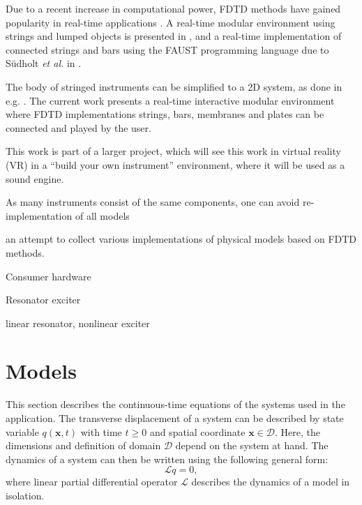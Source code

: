 \documentclass{article}
\begin{document}
Due to a recent increase in computational power, FDTD methods have gained popularity in real-time applications \cite{WillemsenThesis}. A real-time modular environment using strings and lumped objects is presented in \cite{Bilbao2019}, and a real-time implementation of connected strings and bars using the FAUST programming language due to S\"udholt \textit{et al.} in \cite{Sudholt2021}. 

The body of stringed instruments can be simplified to a 2D system, as done in e.g. \cite{Willemsen2019, Willemsen2020}. The current work presents a real-time interactive modular environment where FDTD implementations strings, bars, membranes and plates can be connected and played by the user. 

This work is part of a larger project, which will see this work in virtual reality (VR) in a ``build your own instrument'' environment, where it will be used as a sound engine.

As many instruments consist of the same components, one can avoid re-implementation of all models 

an attempt to collect various implementations of physical models based on FDTD methods. 


Consumer hardware 


Resonator exciter \cite{Borin1989}

linear resonator, nonlinear exciter




\section{Models}\label{sec:models}
This section describes the continuous-time equations of the systems used in the application. The transverse displacement of a system can be described by state variable $q(\boldsymbol{x}, t)$ with time $t\geq 0$ and spatial coordinate $\boldsymbol{x}\in \mathcal{D}$. Here, the dimensions and definition of domain $\mathcal{D}$ depend on the system at hand. The dynamics of a system can then be written using the following general form:
\begin{equation}\label{eq:generalForm}
    \mathcal{L}q = 0,
\end{equation}
where linear partial differential operator $\mathcal{L}$ describes the dynamics of a model in isolation.

\end{document}
